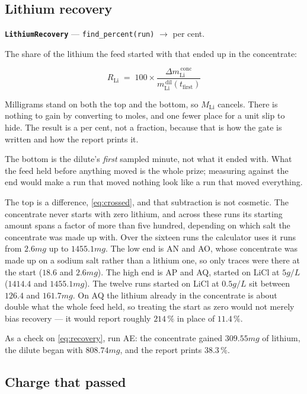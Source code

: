 \subsection{Lithium recovery}

\textbf{\texttt{LithiumRecovery}} --- \texttt{find\_percent(run)} $\rightarrow$ per cent.

The share of the lithium the feed started with that ended up in the concentrate:

\begin{equation}
  R_\mathrm{Li} \;=\; 100 \times
  \frac{\Delta m_\mathrm{Li}^{\,\mathrm{conc}}}{m_\mathrm{Li}^{\,\mathrm{dil}}(t_\mathrm{first})}
  \label{eq:recovery}
\end{equation}

Milligrams stand on both the top and the bottom, so $M_\mathrm{Li}$ cancels. There is nothing to
gain by converting to moles, and one fewer place for a unit slip to hide. The result is a per
cent, not a fraction, because that is how the gate is written and how the report prints it.

The bottom is the dilute's \emph{first} sampled minute, not what it ended with. What the feed
held before anything moved is the whole prize; measuring against the end would make a run that
moved nothing look like a run that moved everything.

The top is a difference, \eqref{eq:crossed}, and that subtraction is not cosmetic. The
concentrate never starts with zero lithium, and across these runs its starting amount spans a
factor of more than five hundred, depending on which salt the concentrate was made up with.
Over the sixteen runs the calculator uses it runs from $2.6\unit{mg}$ up to $1455.1\unit{mg}$.
The low end is AN and AO, whose concentrate was made up on a sodium salt rather than a lithium
one, so only traces were there at the start ($18.6$ and $2.6\unit{mg}$). The high end is AP and
AQ, started on LiCl at $5\unit{g/L}$ ($1414.4$ and $1455.1\unit{mg}$). The twelve runs started
on LiCl at $0.5\unit{g/L}$ sit between $126.4$ and $161.7\unit{mg}$. On AQ the lithium already
in the
concentrate is about double what the whole feed held, so treating the start as zero would not
merely bias recovery --- it would report roughly $214\,\%$ in place of $11.4\,\%$.

As a check on \eqref{eq:recovery}, run AE: the concentrate gained
$309.55\unit{mg}$ of lithium, the dilute began with $808.74\unit{mg}$, and the report prints
$38.3\,\%$.

\subsection{Charge that passed}

